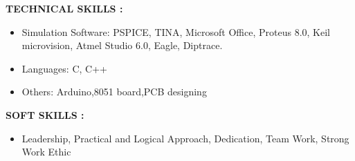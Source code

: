 \documentclass[a4]{article}
\begin{document}
\vspace{3mm}
\textbf{TECHNICAL SKILLS : } 
\begin{itemize}
	\item Simulation Software: PSPICE, TINA, Microsoft Office, Proteus 8.0, Keil microvision, Atmel Studio 6.0, Eagle, Diptrace.
	\item Languages: C, C++
        \item Others: Arduino,8051 board,PCB designing

\end{itemize}

\vspace{3mm}
\textbf{SOFT SKILLS : } 
\begin{itemize}
	\item  Leadership,  Practical  and Logical Approach, Dedication, Team Work, Strong Work Ethic

\end{itemize}
\end{document}
